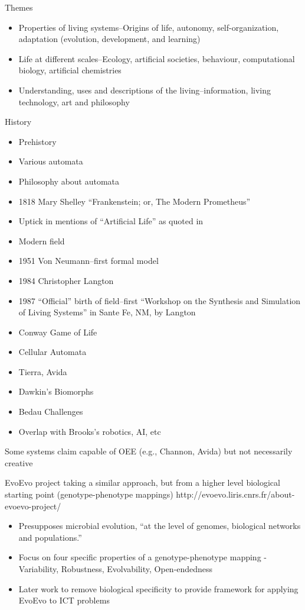 Themes \autocite{Aguilar2014}

\begin{itemize}
	\item
	      Properties of living systems--Origins of life, autonomy, self-organization, adaptation (evolution, development, and learning)
	\item
	      Life at different scales--Ecology, artificial societies, behaviour, computational biology, artificial chemistries
	\item
	      Understanding, uses and descriptions of the living--information, living technology, art and philosophy
\end{itemize}

History

\begin{itemize}
	\item Prehistory
	\item Various automata
	\item
	      Philosophy about automata
	\item
	      1818 Mary Shelley ``Frankenstein; or, The Modern Prometheus''
	\item
	      Uptick in mentions of ``Artificial Life'' as quoted in \autocite{Aguilar2014}
	\item
	      Modern field
	\item
	      1951 Von Neumann--first formal model
	\item
	      1984 Christopher Langton
	\item
	      1987 ``Official'' birth of field--first ``Workshop on the Synthesis
	      and Simulation of Living Systems'' in Sante Fe, NM, by Langton
	\item
	      Conway Game of Life
	\item
	      Cellular Automata
	\item
	      Tierra, Avida
	\item
	      Dawkin's Biomorphs
	\item
	      Bedau Challenges
	\item
	      Overlap with Brooks's robotics, AI, etc
\end{itemize}

Some systems claim capable of OEE (e.g., Channon, Avida) but not necessarily creative

EvoEvo project taking a similar approach, but from a higher level biological starting point (genotype-phenotype mappings)
http://evoevo.liris.cnrs.fr/about-evoevo-project/

\begin{itemize}
	\item Presupposes microbial evolution, ``at the level of genomes, biological networks and populations.''
	\item Focus on four specific properties of a genotype-phenotype mapping - Variability, Robustness, Evolvability, Open-endedness
	\item Later work to remove biological specificity to provide framework for applying EvoEvo to ICT problems
\end{itemize}

